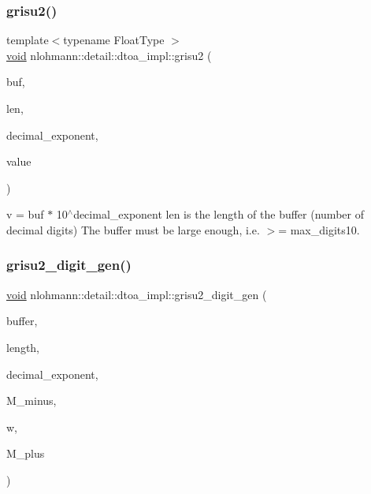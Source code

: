 \subsubsection{\texorpdfstring{grisu2()}{grisu2()}\hspace{0.1cm}{\footnotesize\ttfamily [2/2]}}
{\footnotesize\ttfamily template$<$typename Float\+Type $>$ \\
\mbox{\hyperlink{namespacenlohmann_1_1detail_a59fca69799f6b9e366710cb9043aa77d}{void}} nlohmann\+::detail\+::dtoa\+\_\+impl\+::grisu2 (\begin{DoxyParamCaption}\item[{char $\ast$}]{buf,  }\item[{int \&}]{len,  }\item[{int \&}]{decimal\+\_\+exponent,  }\item[{Float\+Type}]{value }\end{DoxyParamCaption})}

v = buf $\ast$ 10$^\wedge$decimal\+\_\+exponent len is the length of the buffer (number of decimal digits) The buffer must be large enough, i.\+e. $>$= max\+\_\+digits10. \mbox{\label{namespacenlohmann_1_1detail_1_1dtoa__impl_a9b899c72b0e1e3dd46d75c2b4e6bcdfb}} 
\subsubsection{\texorpdfstring{grisu2\_digit\_gen()}{grisu2\_digit\_gen()}}
{\footnotesize\ttfamily \mbox{\hyperlink{namespacenlohmann_1_1detail_a59fca69799f6b9e366710cb9043aa77d}{void}} nlohmann\+::detail\+::dtoa\+\_\+impl\+::grisu2\+\_\+digit\+\_\+gen (\begin{DoxyParamCaption}\item[{char $\ast$}]{buffer,  }\item[{int \&}]{length,  }\item[{int \&}]{decimal\+\_\+exponent,  }\item[{\mbox{\hyperlink{structnlohmann_1_1detail_1_1dtoa__impl_1_1diyfp}{diyfp}}}]{M\+\_\+minus,  }\item[{\mbox{\hyperlink{structnlohmann_1_1detail_1_1dtoa__impl_1_1diyfp}{diyfp}}}]{w,  }\item[{\mbox{\hyperlink{structnlohmann_1_1detail_1_1dtoa__impl_1_1diyfp}{diyfp}}}]{M\+\_\+plus }\end{DoxyParamCaption})\hspace{0.3cm}{\ttfamily [inline]}}

